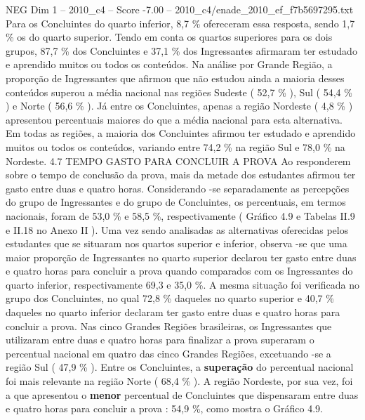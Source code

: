 \begin{textsample}{NEG Dim 1 – 2010\_c4 – Score -7.00 – 2010\_c4/enade\_2010\_ef\_f7b5697295.txt}
Para os Concluintes do quarto inferior, 8,7 \% ofereceram essa resposta, sendo 1,7 \% os do quarto superior.
Tendo em conta os quartos superiores para os dois grupos, 87,7 \% dos Concluintes e 37,1 \% dos Ingressantes afirmaram ter estudado e aprendido muitos ou todos os conteúdos.
Na análise por Grande Região, a proporção de Ingressantes que afirmou que não estudou ainda a maioria desses conteúdos superou a média nacional nas regiões Sudeste ( 52,7 \% ), Sul ( 54,4 \% ) e Norte ( 56,6 \% ).
Já entre os Concluintes, apenas a região Nordeste ( 4,8 \% ) apresentou percentuais maiores do que a média nacional para esta alternativa.
Em todas as regiões, a maioria dos Concluintes afirmou ter estudado e aprendido muitos ou todos os conteúdos, variando entre 74,2 \% na região Sul e 78,0 \% na Nordeste. 4.7 TEMPO GASTO PARA CONCLUIR A PROVA Ao responderem sobre o tempo de conclusão da prova, mais da metade dos estudantes afirmou ter gasto entre duas e quatro horas.
Considerando -se separadamente as percepções do grupo de Ingressantes e do grupo de Concluintes, os percentuais, em termos nacionais, foram de 53,0 \% e 58,5 \%, respectivamente ( Gráfico 4.9 e Tabelas II.9 e II.18 no Anexo II ).
Uma vez sendo analisadas as alternativas oferecidas pelos estudantes que se situaram nos quartos superior e inferior, observa -se que uma maior proporção de Ingressantes no quarto superior declarou ter gasto entre duas e quatro horas para concluir a prova quando comparados com os Ingressantes do quarto inferior, respectivamente 69,3 e 35,0 \%.
A mesma situação foi verificada no grupo dos Concluintes, no qual 72,8 \% daqueles no quarto superior e 40,7 \% daqueles no quarto inferior declaram ter gasto entre duas e quatro horas para concluir a prova.
Nas cinco Grandes Regiões brasileiras, os Ingressantes que utilizaram entre duas e quatro horas para finalizar a prova superaram o percentual nacional em quatro das cinco Grandes Regiões, excetuando -se a região Sul ( 47,9 \% ).
Entre os Concluintes, a \textbf{superação} do percentual nacional foi mais relevante na região Norte ( 68,4 \% ).
A região Nordeste, por sua vez, foi a que apresentou o \textbf{menor} percentual de Concluintes que dispensaram entre duas e quatro horas para concluir a prova : 54,9 \%, como mostra o Gráfico 4.9.

\end{textsample}
